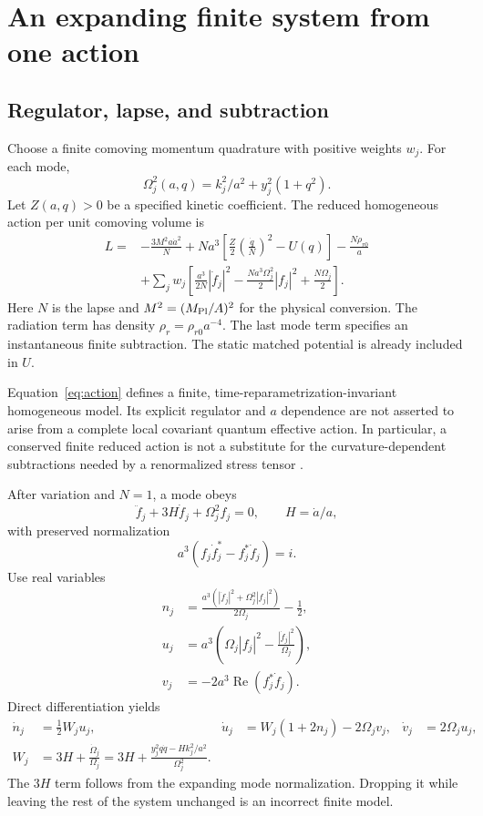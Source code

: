 \documentclass[11pt]{article}
\theoremstyle{definition}\newtheorem{definition}[theorem]{Definition}
\begin{document}
\section{An expanding finite system from one action}
\subsection{Regulator, lapse, and subtraction}
Choose a finite comoving momentum quadrature with positive weights $w_j$. For each mode,
\begin{equation}
\Omega_j^2(a,q)=k_j^2/a^2+y_j^2(1+q^2).
\end{equation}
Let $Z(a,q)>0$ be a specified kinetic coefficient. The reduced homogeneous action per unit comoving volume is
\begin{align}
L={}&-\frac{3M^2a\dot a^2}{N}
 +Na^3\left[\frac{Z}{2}\left(\frac{\dot q}{N}\right)^2-U(q)\right]
 -\frac{N\rho_{r0}}{a}\nonumber\\
&+\sum_jw_j\left[\frac{a^3}{2N}|\dot f_j|^2
 -\frac{Na^3\Omega_j^2}{2}|f_j|^2+\frac{N\Omega_j}{2}\right].\label{eq:action}
\end{align}
Here $N$ is the lapse and $M^2=(M_{\rm Pl}/A)^2$ for the physical conversion. The radiation term has density $\rho_r=\rho_{r0}a^{-4}$. The last mode term specifies an instantaneous finite subtraction. The static matched potential is already included in $U$.

Equation~\eqref{eq:action} defines a finite, time-reparametrization-invariant homogeneous model. Its explicit regulator and $a$ dependence are not asserted to arise from a complete local covariant quantum effective action. In particular, a conserved finite reduced action is not a substitute for the curvature-dependent subtractions needed by a renormalized stress tensor \cite{molina,ferreiro}.

After variation and $N=1$, a mode obeys
\begin{equation}
\ddot f_j+3H\dot f_j+\Omega_j^2f_j=0,\qquad H=\dot a/a,
\end{equation}
with preserved normalization
\begin{equation}
a^3(f_j\dot f_j^*-f_j^*\dot f_j)=i.
\end{equation}
Use real variables
\begin{align}
n_j&=\frac{a^3(|\dot f_j|^2+\Omega_j^2|f_j|^2)}{2\Omega_j}-\frac12,\\
u_j&=a^3\left(\Omega_j|f_j|^2-\frac{|\dot f_j|^2}{\Omega_j}\right),\\
v_j&=-2a^3\operatorname{Re}(f_j^*\dot f_j).
\end{align}
Direct differentiation yields
\begin{align}
\dot n_j&=\tfrac12W_ju_j,&
\dot u_j&=W_j(1+2n_j)-2\Omega_jv_j,&
\dot v_j&=2\Omega_ju_j,\label{eq:kinetic}\\
W_j&=3H+\frac{\dot\Omega_j}{\Omega_j}
=3H+\frac{y_j^2q\dot q-Hk_j^2/a^2}{\Omega_j^2}.\label{eq:W}
\end{align}
The $3H$ term follows from the expanding mode normalization. Dropping it while leaving the rest of the system unchanged is an incorrect finite model.
\end{document}
